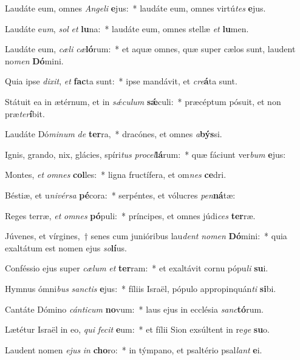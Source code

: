 \item Laudáte eum, omnes \textit{An}\textit{ge}\textit{li} \textbf{e}jus:~* laudáte eum, omnes virtú\textit{tes} \textbf{e}jus.
\item Laudáte e\textit{um}, \textit{sol} \textit{et} \textbf{lu}na:~* laudáte eum, omnes stellæ \textit{et} \textbf{lu}men.
\item Laudáte eum, \textit{cæ}\textit{li} \textit{cæ}\textbf{ló}rum:~* et aquæ omnes, quæ super cælos sunt, laudent no\textit{men} \textbf{Dó}mini.
\item Quia ipse \textit{di}\textit{xit}, \textit{et} \textbf{fac}ta sunt:~* ipse mandávit, et \textit{cre}\textbf{á}ta sunt.
\item Státuit ea in ætérnum, et in \textit{sǽ}\textit{cu}\textit{lum} \textbf{sǽ}culi:~* præcéptum pósuit, et non præ\textit{ter}\textbf{í}bit.
\item Laudáte Dó\textit{mi}\textit{num} \textit{de} \textbf{ter}ra,~* dracónes, et omnes \textit{a}\textbf{býs}si.
\item Ignis, grando, nix, glácies, spíri\textit{tus} \textit{pro}\textit{cel}\textbf{lá}rum:~* quæ fáciunt ver\textit{bum} \textbf{e}jus:
\item Montes, \textit{et} \textit{om}\textit{nes} \textbf{col}les:~* ligna fructífera, et om\textit{nes} \textbf{ce}dri.
\item Béstiæ, et u\textit{ni}\textit{vér}\textit{sa} \textbf{pé}cora:~* serpéntes, et vólucres \textit{pen}\textbf{ná}tæ:
\item Reges terræ, \textit{et} \textit{om}\textit{nes} \textbf{pó}puli:~* príncipes, et omnes júdi\textit{ces} \textbf{ter}ræ.
\item Júvenes, et vírgines,~† senes cum junióribus lau\textit{dent} \textit{no}\textit{men} \textbf{Dó}mini:~* quia exaltátum est nomen ejus \textit{so}\textbf{lí}us.
\item Conféssio ejus super \textit{cæ}\textit{lum} \textit{et} \textbf{ter}ram:~* et exaltávit cornu pópu\textit{li} \textbf{su}i.
\item Hymnus ómni\textit{bus} \textit{sanc}\textit{tis} \textbf{e}jus:~* fíliis Israël, pópulo appropinquán\textit{ti} \textbf{si}bi.
\item Cantáte Dómino \textit{cán}\textit{ti}\textit{cum} \textbf{no}vum:~* laus ejus in ecclésia \textit{sanc}\textbf{tó}rum.
\item Lætétur Israël in eo, \textit{qui} \textit{fe}\textit{cit} \textbf{e}um:~* et fílii Sion exsúltent in re\textit{ge} \textbf{su}o.
\item Laudent nomen \textit{e}\textit{jus} \textit{in} \textbf{cho}ro:~* in týmpano, et psaltério psal\textit{lant} \textbf{e}i.
